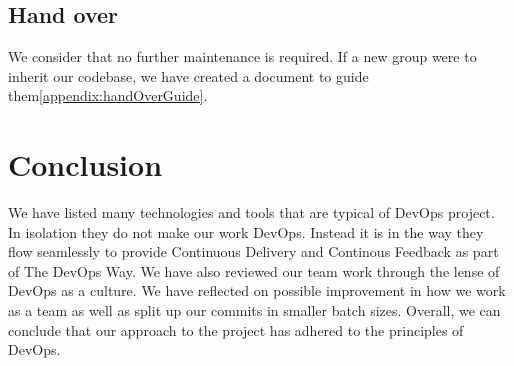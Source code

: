 \documentclass{article}
\begin{document}
\subsection{Hand over}

We consider that no further maintenance is required. If a new group were to inherit our codebase, we have created a document to guide them\ref{appendix:handOverGuide}. 

\section{Conclusion}

We have listed many technologies and tools that are typical of DevOps project. In isolation they do not make our work DevOps. Instead it is in the way they flow seamlessly to provide Continuous Delivery and Continous Feedback as part of The DevOps Way. We have also reviewed our team work through the lense of DevOps as a culture. We have reflected on possible improvement in how we work as a team as well as split up our commits in smaller batch sizes. Overall, we can conclude that our approach to the project has adhered to the principles of DevOps. 



\end{document}

